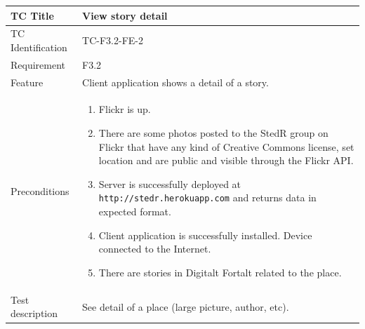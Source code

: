 \documentclass[11pt]{book}
\begin{document}
\begin{table}
  \begin{tabular}{| p{3cm} | p{9.5cm} |} \hline 
    TC Title              & View story detail \\ \hline 
    TC Identification     & TC-F3.2-FE-2 \\ \hline 
    Requirement           & F3.2 \\ \hline 
    Feature               & Client application shows a detail of a story. \\ \hline 
    Preconditions         & \begin{enumerate}
                              \item Flickr is up.
                              \item There are some photos posted to the StedR group on Flickr that have any kind of
                               Creative Commons license, set location and are public and visible through the Flickr API.
                              \item Server is successfully deployed at \texttt{http://stedr.herokuapp.com} and returns data in expected format.
                              \item Client application is successfully installed. Device connected to the Internet.
                              \item There are stories in Digitalt Fortalt related to the place.
                            \end{enumerate} \\ \hline 

    Test description      & See detail of a place (large picture, author, etc).


\end{tabular}
\end{table}
\end{document}
